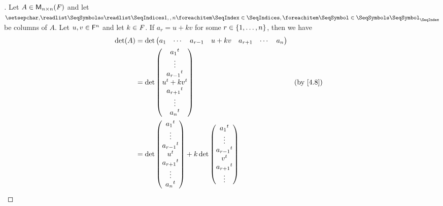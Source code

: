 \begin{proof}[]
	Let \(A \in \ms[n][n][\F]\) and let \(\seq{a}{1,,n}\) be columns of \(A\).
	Let \(u, v \in \mathsf{F}^n\) and let \(k \in \mathit{F}\).
	If \(a_r = u + kv\) for some \(r \in \left\lbrace1, \dots, n\right\rbrace\), then we have
	\begin{align*}
		\det(A) & = \det\begin{pmatrix}
			                a_1 & \cdots & a_{r - 1} & u + kv & a_{r + 1} & \cdots & a_n
		                \end{pmatrix}              \\
		        & = \det\begin{pmatrix}
			                \tp{a_1}          \\
			                \vdots            \\
			                \tp{a_{r - 1}}    \\
			                \tp{u} + k \tp{v} \\
			                \tp{a_{r + 1}}    \\
			                \vdots            \\
			                \tp{a_n}
		                \end{pmatrix}                      &  & \by{4.8}                          \\
		        & = \det\begin{pmatrix}
			                \tp{a_1}       \\
			                \vdots         \\
			                \tp{a_{r - 1}} \\
			                \tp{u}         \\
			                \tp{a_{r + 1}} \\
			                \vdots         \\
			                \tp{a_n}
		                \end{pmatrix} + k \det\begin{pmatrix}
			                                      \tp{a_1}       \\
			                                      \vdots         \\
			                                      \tp{a_{r - 1}} \\
			                                      \tp{v}         \\
			                                      \tp{a_{r + 1}} \\
			                                      \vdots         \\

\end{pmatrix}
\end{align*}
\end{proof}
